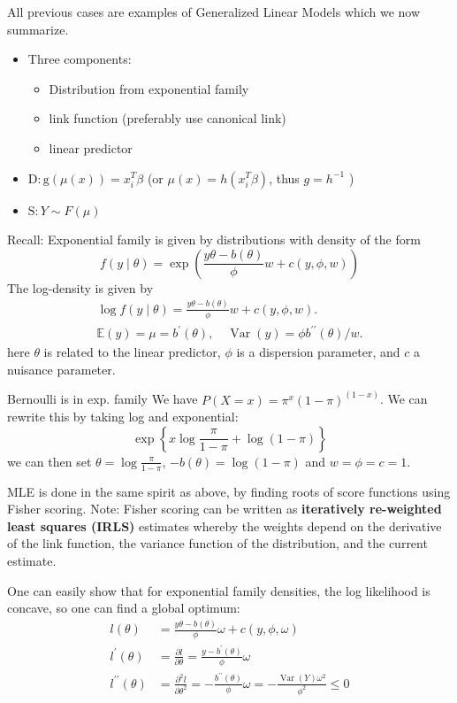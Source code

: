 \documentclass[11pt, %
	oneside, %
	english, %
	onehalfspacing, %
	]{article} %
\numberwithin{equation}{section}
\begin{document}
All previous cases are examples of Generalized Linear Models which we now summarize.

\begin{itemize}
	\item Three components:
    \begin{itemize}
        \item Distribution from exponential family
        \item link function (preferably use canonical link)
        \item linear predictor
    \end{itemize}
	\item $\mathrm{D}: \mathrm{g}(\mu(x))=x_i^T \beta$ (or $\mu(x)=h\left(x_i^T \beta\right)$, thus $g=h^{-1}$ )
    \item $\mathrm{S}: Y \sim F(\mu)$
\end{itemize}

Recall: Exponential family is given by distributions with density of the form
$$
f(y \mid \theta)=\exp \left(\frac{y \theta-b(\theta)}{\phi} w+c(y, \phi, w)\right)
$$
The log-density is given by
$$
\begin{gathered}
\log f(y \mid \theta)=\frac{y \theta-b(\theta)}{\phi} w+c(y, \phi, w) . \\
\mathbb{E}(y)=\mu=b^{\prime}(\theta), \quad \operatorname{Var}(y)=\phi b^{\prime \prime}(\theta) / w .
\end{gathered}
$$
here $\theta$ is related to the linear predictor, $\phi$ is a dispersion parameter, and $c$ a nuisance parameter.

\begin{example}{Bernoulli is in exp. family}{}
    We have $P(X = x) = \pi^x (1-\pi)^{(1-x)}$. We can rewrite this by taking log and exponential:
    \begin{equation*}
        \exp \left\{ x \log \frac{\pi}{1-\pi} + \log (1-\pi)\right\}
    \end{equation*}
    we can then set $\theta =\log \frac{\pi}{1-\pi}$, $-b(\theta) =\log (1-\pi)$ and $w = \phi = c = 1$.
\end{example}

MLE is done in the same spirit as above, by finding roots of score functions using Fisher scoring. Note: Fisher scoring can be written as \textbf{iteratively re-weighted least squares (IRLS)} estimates whereby the weights depend on the derivative of the link function, the variance function of the distribution, and the current estimate.

One can easily show that for exponential family densities, the log likelihood is concave, so one can find a global optimum:
$$
    \begin{aligned}
    l(\theta)&=\frac{y \theta-b(\theta)}{\phi} \omega+c(y, \phi, \omega) \\
    l^{\prime}(\theta)&=\frac{\partial l}{\partial \theta}=\frac{y-b^{\prime}(\theta)}{\phi} \omega \\
    l^{\prime \prime}(\theta)&=\frac{\partial^2 l}{\partial \theta^2}=-\frac{b^{\prime \prime}(\theta)}{\phi} \omega=-\frac{\operatorname{Var}(Y) \omega^2}{\phi^2} \leq 0
    \end{aligned}
$$
\end{document}
